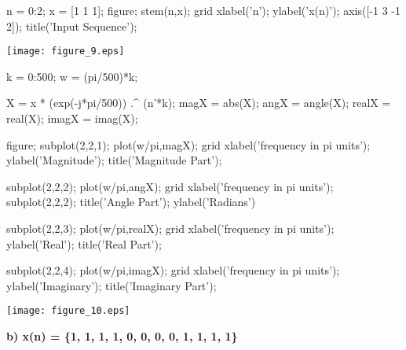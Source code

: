 \documentclass[12pt, onecolumn]{IEEEtran}
\begin{document}
	\begin{matlabcode}
		n = 0:2; 
		x = [1 1 1];
		figure; stem(n,x); grid
		xlabel('n'); ylabel('x(n)');
		axis([-1 3 -1 2]); title('Input Sequence');
	\end{matlabcode}
	\begin{center}
		\texttt{[image: figure\_9.eps]}
	\end{center}
	\begin{matlabcode}
		
		k = 0:500; 
		w = (pi/500)*k;  
		
		X = x * (exp(-j*pi/500)) .^ (n'*k); %
		magX = abs(X); angX = angle(X);
		realX = real(X); imagX = imag(X);
		
		figure; subplot(2,2,1); plot(w/pi,magX); grid
		xlabel('frequency in pi units'); ylabel('Magnitude');
		title('Magnitude Part'); 
		
		subplot(2,2,2); plot(w/pi,angX); grid
		xlabel('frequency in pi units'); subplot(2,2,2); 
		title('Angle Part'); ylabel('Radians')
		
		subplot(2,2,3); plot(w/pi,realX); grid
		xlabel('frequency in pi units');  ylabel('Real');
		title('Real Part');
		
		subplot(2,2,4); plot(w/pi,imagX); grid
		xlabel('frequency in pi units'); ylabel('Imaginary');
		title('Imaginary Part'); 
	\end{matlabcode}
	\begin{center}
		\texttt{[image: figure\_10.eps]}
	\end{center}
	
	\begin{par}
		\begin{flushleft}
			\textbf {b) x(n) = \{1, 1, 1, 1, 0, 0, 0, 0, 1, 1, 1, 1\}} 
		\end{flushleft}
	\end{par}
	
\end{document}
